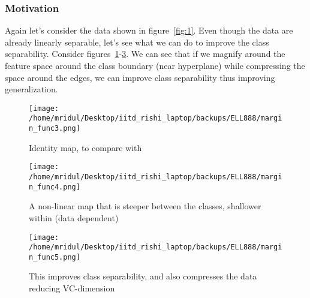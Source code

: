 \documentclass[11pt]{article}
\begin{document}
\subsubsection{Motivation}
Again let's consider the data shown in figure~\ref{fig:1}. Even though the data
are already linearly separable, let's see what we can do to improve the class
separability. Consider figures~\ref{fig:3}\nobreakdash-\ref{fig:5}. We can see that if we
magnify around the feature space around the class boundary (near hyperplane)
while compressing the space around the edges, we can improve class separability
thus improving generalization.
\begin{figure}[!htbp]
    \centering
    \texttt{[image: /home/mridul/Desktop/iitd\_rishi\_laptop/backups/ELL888/margin\_func3.png]}
    \caption{\label{fig:3}Identity map, to compare with}
\end{figure}
\begin{figure}[!htbp]
    \centering
    \texttt{[image: /home/mridul/Desktop/iitd\_rishi\_laptop/backups/ELL888/margin\_func4.png]}
    \caption{\label{fig:4}A non-linear map that is steeper between the classes,
    shallower within (data dependent)}
\end{figure}
\begin{figure}[!htbp]
    \centering
    \texttt{[image: /home/mridul/Desktop/iitd\_rishi\_laptop/backups/ELL888/margin\_func5.png]}
    \caption{\label{fig:5}This improves class separability, and also compresses
    the data reducing VC-dimension}
\end{figure}
\end{document}
